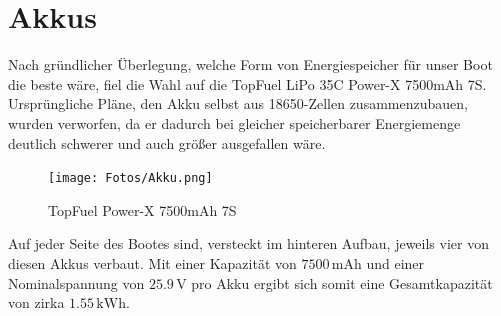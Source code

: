 \newpage
\section{Akkus \label{sec:Akkus}}
Nach gründlicher Überlegung, welche Form von Energiespeicher für unser Boot die beste wäre, fiel die Wahl auf die TopFuel LiPo 35C Power-X 7500mAh 7S.
Ursprüngliche Pläne, den Akku selbst aus 18650-Zellen zusammenzubauen, wurden verworfen, da er dadurch bei gleicher speicherbarer Energiemenge deutlich schwerer und auch größer ausgefallen wäre.
\begin{figure}[h]
    \centering
    \texttt{[image: Fotos/Akku.png]}
    \caption{TopFuel Power-X 7500mAh 7S}
\end{figure}

Auf jeder Seite des Bootes sind, versteckt im hinteren Aufbau, jeweils vier von diesen Akkus verbaut. Mit einer Kapazität von $7500\,\textrm{mAh}$ und einer Nominalspannung von $25.9\,\mathrm{V}$ pro Akku ergibt sich somit eine Gesamtkapazität von zirka $1.55\,\mathrm{kWh}$.

\newpage